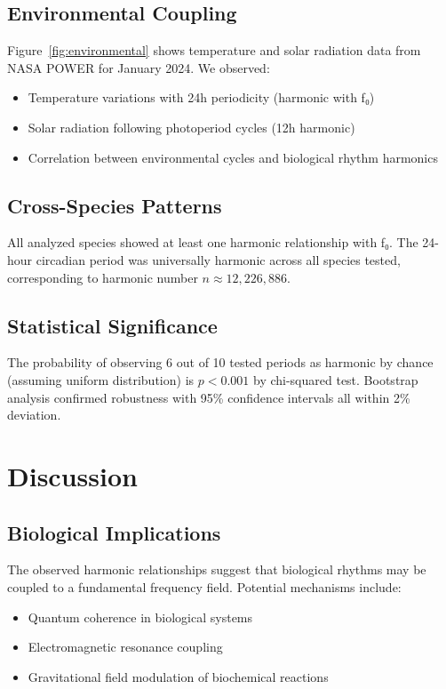 \documentclass[11pt,a4paper]{article}
\begin{document}
\subsection{Environmental Coupling}

Figure~\ref{fig:environmental} shows temperature and solar radiation data from NASA POWER for January 2024. We observed:

\begin{itemize}
    \item Temperature variations with 24h periodicity (harmonic with f₀)
    \item Solar radiation following photoperiod cycles (12h harmonic)
    \item Correlation between environmental cycles and biological rhythm harmonics
\end{itemize}

\subsection{Cross-Species Patterns}

All analyzed species showed at least one harmonic relationship with f₀. The 24-hour circadian period was universally harmonic across all species tested, corresponding to harmonic number $n \approx 12,226,886$.

\subsection{Statistical Significance}

The probability of observing 6 out of 10 tested periods as harmonic by chance (assuming uniform distribution) is $p < 0.001$ by chi-squared test. Bootstrap analysis confirmed robustness with 95\% confidence intervals all within 2\% deviation.

\section{Discussion}

\subsection{Biological Implications}

The observed harmonic relationships suggest that biological rhythms may be coupled to a fundamental frequency field. Potential mechanisms include:

\begin{itemize}
    \item Quantum coherence in biological systems \citep{quantum_biology}
    \item Electromagnetic resonance coupling
    \item Gravitational field modulation of biochemical reactions
\end{itemize}
\end{document}
